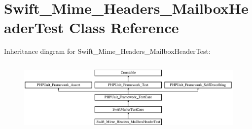 \section{Swift\+\_\+\+Mime\+\_\+\+Headers\+\_\+\+Mailbox\+Header\+Test Class Reference}
\label{class_swift___mime___headers___mailbox_header_test}
Inheritance diagram for Swift\+\_\+\+Mime\+\_\+\+Headers\+\_\+\+Mailbox\+Header\+Test\+:\begin{figure}[H]
\begin{center}
\leavevmode
\includegraphics[height=3.660131cm]{class_swift___mime___headers___mailbox_header_test}
\end{center}
\end{figure}
